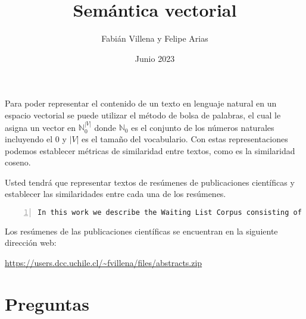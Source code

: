\documentclass{article}
\title{Semántica vectorial}
\author{Fabián Villena y Felipe Arias}
\date{Junio 2023}
\begin{document}
\maketitle

Para poder representar el contenido de un texto en lenguaje natural en un espacio vectorial se puede utilizar el método de bolsa de palabras, el cual le asigna un vector en $\mathbb{N}_0^{|V|}$ donde $\mathbb{N}_{0}$ es el conjunto de los números naturales incluyendo el 0 y $|V|$ es el tamaño del vocabulario. Con estas representaciones podemos establecer métricas de similaridad entre textos, como es la similaridad coseno.

Usted tendrá que representar textos de resúmenes de publicaciones científicas y establecer las similaridades entre cada una de los resúmenes.

\begin{lstlisting}[breaklines=true, extendedchars=true,numbers=left,frame=single,caption=Resumen de una publicación]
In this work we describe the Waiting List Corpus consisting of de-identified referrals for several specialty consultations from the waiting list in Chilean public hospitals. A subset of 900 referrals was manually annotated with 9,029 entities, 385 attributes, and 284 pairs of relations with clinical relevance. A trained medical doctor annotated these referrals, and then together with other three researchers, consolidated each of the annotations. The annotated corpus has nested entities, with 32.2% of entities embedded in other entities. We use this annotated corpus to obtain preliminary results for Named Entity Recognition (NER). The best results were achieved by using a biLSTM-CRF architecture using word embeddings trained over Spanish Wikipedia together with clinical embeddings computed by the group. NER models applied to this corpus can leverage statistics of diseases and pending procedures within this waiting list.
\end{lstlisting}

Los resúmenes de las publicaciones científicas se encuentran en la siguiente dirección web:

\begin{center}
	\url{https://users.dcc.uchile.cl/~fvillena/files/abstracts.zip}
\end{center}

\section*{Preguntas}
\end{document}
